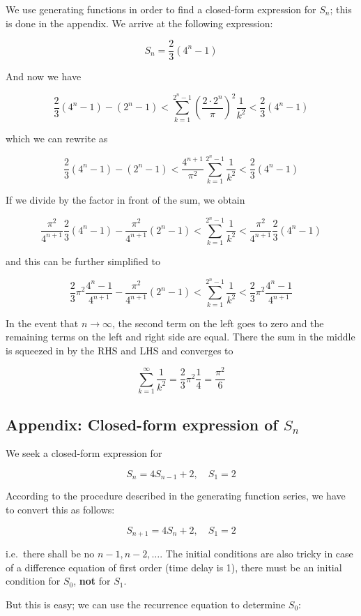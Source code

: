 {We use generating functions in order to find a closed-form expression for $S_n$; this is done in the appendix. We arrive at the following expression:

\[S_n = \frac{2}{3}(4^n-1)\]

And now we have

\[ \frac{2}{3}(4^n-1) - (2^n-1)  < \sum_{k=1}^{2^n-1} \left( \frac{2 \cdot 2^n}{\pi}\right)^2 \frac{1}{k^2} < \frac{2}{3}(4^n-1) \]

which we can rewrite as

\[ \frac{2}{3}(4^n-1) - (2^n-1)  < \frac{4^{n+1}}{\pi^2} \sum_{k=1}^{2^n-1} \frac{1}{k^2} < \frac{2}{3}(4^n-1) \]

If we divide by the factor in front of the sum, we obtain

\[ \frac{\pi^2}{4^{n+1}} \frac{2}{3}(4^n-1) - \frac{\pi^2}{4^{n+1}} (2^n-1)  < \sum_{k=1}^{2^n-1} \frac{1}{k^2} < \frac{\pi^2}{4^{n+1}} \frac{2}{3}(4^n-1) \]

and this can be further simplified to

\[ \frac{2}{3} \pi^2 \frac{4^n-1}{4^{n+1}} - \frac{\pi^2}{4^{n+1}} (2^n-1) < \sum_{k=1}^{2^n-1} \frac{1}{k^2} < \frac{2}{3} \pi^2 \frac{4^n-1}{4^{n+1}} \]

In the event that $n\rightarrow \infty$, the second term on the left goes to zero and the remaining terms on the left and right side are equal. There the sum in the middle is squeezed in by the RHS and LHS and converges to

\[\sum_{k=1}^\infty \frac{1}{k^2} = \frac{2}{3} \pi^2 \frac{1}{4} = \frac{\pi^2}{6} \]

\subsection{Appendix: Closed-form expression of $S_n$}

We seek a closed-form expression for

\[S_n = 4 S_{n-1} + 2, \quad S_1 = 2\]

According to the procedure described in the generating function series,
we have to convert this as follows:

\[S_{n+1} = 4 S_{n} + 2, \quad S_1 = 2\]

i.e.~there shall be no $n-1,n-2,\ldots$. The initial conditions are also tricky in case of a difference equation of first order (time delay is 1), there must be an initial condition for $S_0$,
\textbf{not} for $S_1$.

But this is easy; we can use the recurrence equation to determine
$S_0$:

}
